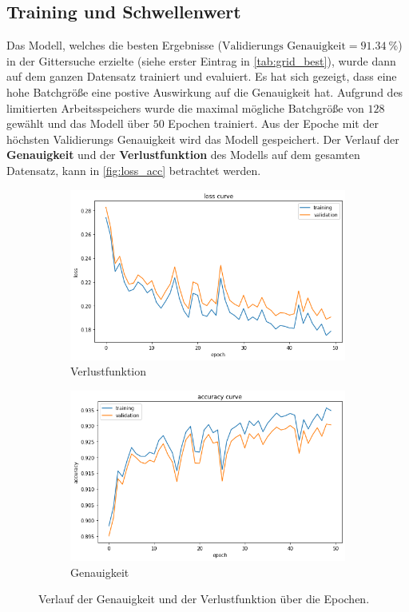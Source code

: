 \subsection{Training und Schwellenwert}
Das Modell, welches die besten Ergebnisse ($\text{Validierungs Genauigkeit} = \SI{91.34}{\percent}$) in der Gittersuche erzielte (siehe erster Eintrag in \autoref{tab:grid_best}), wurde dann auf dem ganzen Datensatz trainiert und evaluiert.
Es hat sich gezeigt, dass eine hohe Batchgröße eine postive Auswirkung auf die Genauigkeit hat.
Aufgrund des limitierten Arbeitsspeichers wurde die maximal mögliche Batchgröße von $128$ gewählt und das Modell über $50$ Epochen trainiert.
Aus der Epoche mit der höchsten Validierungs Genauigkeit wird das Modell gespeichert.
Der Verlauf der \textbf{Genauigkeit} und der \textbf{Verlustfunktion} des Modells auf dem gesamten Datensatz, kann in \autoref{fig:loss_acc} betrachtet werden.
\begin{figure}
    \centering
    \begin{subfigure}{0.48\textwidth}
        \centering
        \includegraphics[width=\textwidth]{content/img/loss.png}
        \caption{Verlustfunktion}
    \end{subfigure}
    \begin{subfigure}{0.48\textwidth}
        \centering
        \includegraphics[width=\textwidth]{content/img/acc.png}
        \caption{Genauigkeit}
    \end{subfigure}
    \caption{Verlauf der Genauigkeit und der Verlustfunktion über die Epochen.}
    \label{fig:loss_acc}
\end{figure}

